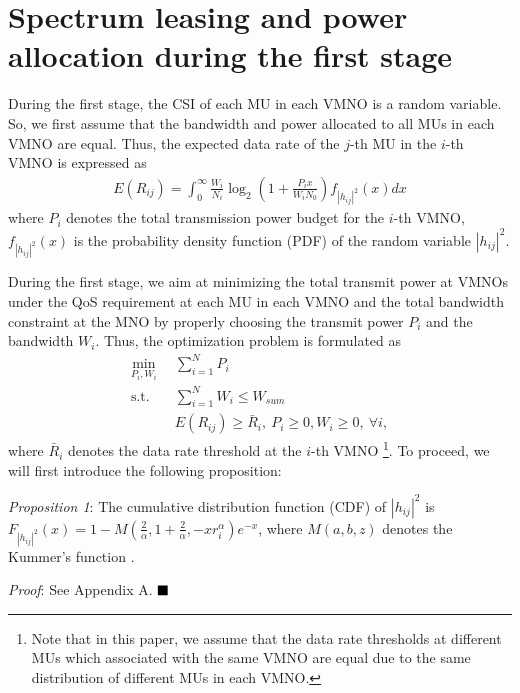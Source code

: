 \documentclass[journal]{IEEEtran}
\begin{document}
\section{Spectrum leasing and power allocation during the first stage}

During the first stage, the CSI of each MU in each VMNO is a random variable. So, we first assume that the bandwidth and power allocated to all MUs in each VMNO are equal. Thus, the expected data rate of the $j$-th MU in the $i$-th VMNO is expressed as
\begin{align}
E\left({R}_{ij}\right) = \int_{0}^{\infty} \frac{W_i}{N_i} \log_2\left(1 + \frac{P_i x}{W_i N_0}\right) f_{\left|h_{ij} \right|^2} \left(x\right)dx
\end{align}
where $P_i$ denotes the total transmission power budget for the $i$-th VMNO, $f_{\left|h_{ij} \right|^2} \left(x\right)$ is the probability density function (PDF) of the random variable $\left|h_{ij} \right|^2$. 

During the first stage, we aim at minimizing the total transmit power at VMNOs under the QoS requirement at each MU in each VMNO and the total bandwidth constraint at the MNO by properly choosing the transmit power $P_i$ and the bandwidth $W_i$. Thus, the optimization problem is formulated as
\begin{subequations}\label{q4}
	\begin{align}
	\min_{P_i, W_i}\ & \sum\limits_{i = 1}^{N} P_i \\ \mbox{s.t.} \quad &  \sum\limits_{i = 1}^{N} W_i \leq W_{sum}\\ \quad &  E\left({R}_{ij}\right) \geq \bar{R}_i, \ P_i \geq 0, W_i \geq 0, \ \forall i, 
	\end{align}
\end{subequations}
where $\bar{R}_i$ denotes the data rate threshold at the $i$-th VMNO  \footnote{Note that in this paper, we assume that the data rate thresholds at different MUs which associated with the same VMNO are equal due to the same distribution of different MUs in each VMNO.}. To proceed, we will first introduce the following proposition:

\textit{Proposition 1}: The cumulative distribution function (CDF) of $\left|h_{ij} \right|^2$ is $F_{\left|h_{ij} \right|^2}\left(x\right) = 1 - M\left(\frac{2}{\alpha}, 1 + \frac{2}{\alpha}, - x r_i^{\alpha}\right)e^{-x}$, where $M\left(a,b,z\right)$ denotes the Kummer's function \cite{MAbramowitz}.


\textit{Proof}: See Appendix A.  $\hfill\blacksquare$
\end{document}
